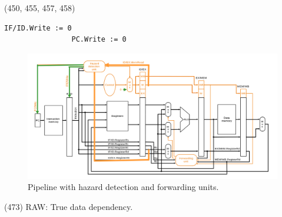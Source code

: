 \begin{theorem}{(450, 455, 457, 458)}
\begin{itemize}
\begin{lstlisting}[caption={Stall.}, captionpos=b, mathescape=true]
                IF/ID.Write := 0
                PC.Write := 0
        \end{lstlisting}
        \begin{figure}[H]
            \centering
            \includegraphics[scale=0.3]{img/pipeline-hazard.png}
            \caption{Pipeline with hazard detection and forwarding units.}
            \label{img:pipeline-hazard}
        \end{figure}
    \end{itemize}
\end{theorem}

\item \begin{theorem}{(473)} RAW: True data dependency.
\end{theorem}


